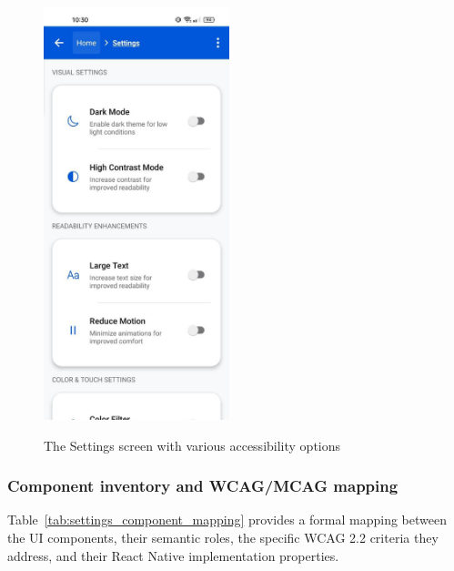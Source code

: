 \begin{figure}[ht]
    \centering
    \includegraphics[width=0.48\textwidth, alt={Settings screen showing accessibility options}]{img/settings_normal.jpg}
    \caption{The Settings screen with various accessibility options}
    \label{fig:settings_screen_main}
\end{figure}

\subsubsection{Component inventory and WCAG/MCAG mapping}

Table~\ref{tab:settings_component_mapping} provides a formal mapping between the UI components, their semantic roles, the specific WCAG 2.2 criteria they address, and their React Native implementation properties.

